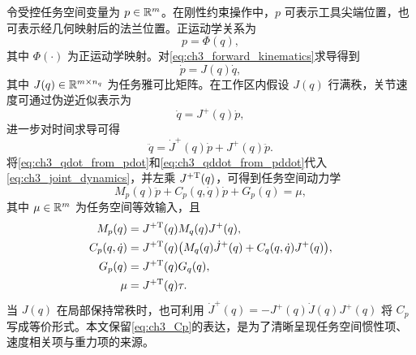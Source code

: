 令受控任务空间变量为 $p\in\mathbb{R}^m$。在刚性约束操作中，$p$ 可表示工具尖端位置，也可表示经几何映射后的法兰位置。正运动学关系为
\begin{equation}
  p=\Phi(q),
  \label{eq:ch3_forward_kinematics}
\end{equation}
其中 $\Phi(\cdot)$ 为正运动学映射。对\eqref{eq:ch3_forward_kinematics}求导得到
\begin{equation}
  \dot p=J(q)\dot q,
  \label{eq:ch3_task_velocity}
\end{equation}
其中 $J(q)\in\mathbb{R}^{m\times n_q}$ 为任务雅可比矩阵。在工作区内假设 $J(q)$ 行满秩，关节速度可通过伪逆近似表示为
\begin{equation}
  \dot q=J^+(q)\dot p,
  \label{eq:ch3_qdot_from_pdot}
\end{equation}
进一步对时间求导可得
\begin{equation}
  \ddot q=\dot J^+(q)\dot p+J^+(q)\ddot p .
  \label{eq:ch3_qddot_from_pddot}
\end{equation}
将\eqref{eq:ch3_qdot_from_pdot}和\eqref{eq:ch3_qddot_from_pddot}代入\eqref{eq:ch3_joint_dynamics}，并左乘 $J^{+\mathrm{T}}(q)$，可得到任务空间动力学
\begin{equation}
  M_p(q)\ddot p+C_p(q,\dot q)\dot p+G_p(q)=\mu,
  \label{eq:ch3_task_dynamics}
\end{equation}
其中 $\mu\in\mathbb{R}^m$ 为任务空间等效输入，且
\begin{align}
  M_p(q)&=J^{+\mathrm{T}}(q)M_q(q)J^+(q),
  \label{eq:ch3_Mp}\\
  C_p(q,\dot q)&=J^{+\mathrm{T}}(q)\bigl(M_q(q)\dot J^+(q)+C_q(q,\dot q)J^+(q)\bigr),
  \label{eq:ch3_Cp}\\
  G_p(q)&=J^{+\mathrm{T}}(q)G_q(q),
  \label{eq:ch3_Gp}\\
  \mu&=J^{+\mathrm{T}}(q)\tau .
  \label{eq:ch3_mu}
\end{align}
当 $J(q)$ 在局部保持常秩时，也可利用 $\dot J^+(q)=-J^+(q)\dot J(q)J^+(q)$ 将 $C_p$ 写成等价形式。本文保留\eqref{eq:ch3_Cp}的表达，是为了清晰呈现任务空间惯性项、速度相关项与重力项的来源。

